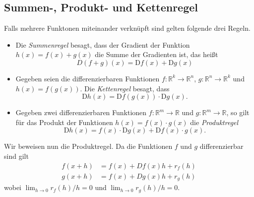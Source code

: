 

\subsection{Summen-, Produkt- und Kettenregel}

Falls mehrere Funktonen miteinander verknüpft sind gelten folgende drei Regeln.
\begin{itemize}
\item Die \emph{Summenregel} besagt, dass der Gradient der Funktion $h(x)=f(x)+g(x)$ die Summe der Gradienten ist, das heißt
\begin{equation*} D(f + g)(x)=\text{D} f(x)+\text{D} g(x)\end{equation*}

\item Gegeben seien die differenzierbaren Funktionen $f:\mathbb{R}^k\rightarrow\mathbb{R}^n$, $g:\mathbb{R}^n\rightarrow\mathbb{R}^k$ und $h(x)=f(g(x))$. Die \emph{Kettenregel} besagt, dass
\begin{equation*}
\text{D}h(x) = \text{D}f(g(x)) \cdot \text{D} g(x).
\end{equation*}

\item Gegeben zwei differenzierbaren Funktionen $f:\mathbb{R}^m\rightarrow\mathbb{R}$ und $g:\mathbb{R}^m\rightarrow\mathbb{R}$, so gilt für das Produkt der Funktionen $h(x)=f(x) \cdot g(x)$ die \emph{Produktregel} \begin{equation*}\text{D}h(x)=f(x) \cdot \text{D}g(x)+\text{D}f(x) \cdot g(x).\end{equation*}
 \end{itemize}
Wir beweisen nun die Produktregel.
Da die Funktionen $f$ und $g$ differenzierbar sind gilt
\begin{align*}
  f(x+h) &= f(x) +  Df(x) h + r_{f}(h)\\
  g(x+h) &= f(x) + Dg(x) h + r_{g}(h)
\end{align*}
wobei $\lim_{h\rightarrow 0} r_f(h)/h = 0$ und $\lim_{h\rightarrow 0} r_g(h)/h = 0$.
